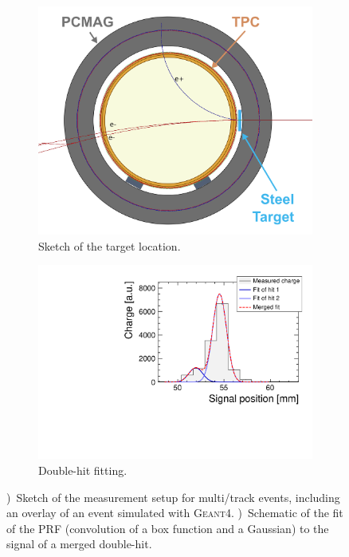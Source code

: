 \begin{figure}[tbhp!]
\begin{subfigure}[b]{0.46\textwidth}
\includegraphics[width=\textwidth]{Tracker/TPC_Bonn/plots/TPC-DG_steel-target_principle_geant4.png}
\caption{Sketch of the target location.}
\label{sfig:target_principle_simu}
\end{subfigure}%
\begin{subfigure}[b]{0.54\textwidth}
\includegraphics[width=\textwidth]{Tracker/TPC_Bonn/plots/TPC-DG_DoubleHitSplittingPrinciple.pdf}
\caption{Double-hit fitting.}
\label{sfig:mergedhit}
\end{subfigure}
\caption{\protect{})~Sketch of the measurement setup for multi\-/track events, including an overlay of an event simulated with \textsc{Geant4}. \protect{})~Schematic of the fit of the PRF (convolution of a box function and a Gaussian) to the signal of a merged double-hit.}
\label{fig:doublehitseparationprinciple}
\end{figure}

